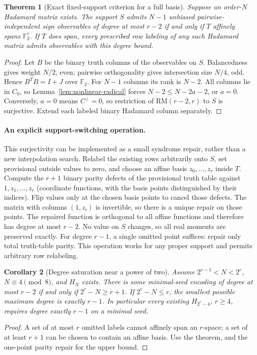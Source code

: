 \documentclass[11pt]{article}
\newtheorem{theorem}{Theorem}[section]
\newtheorem{corollary}[theorem]{Corollary}
\begin{document}
\begin{theorem}[Exact fixed-support criterion for a full basis]
\label{thm:nonlinear-fixed-support}
Suppose an order-$N$ Hadamard matrix exists. The support $S$ admits
$N-1$ unbiased pairwise-independent sign observables of degree at most
$r-2$ if and only if $T$ affinely spans $\mathbb F_2^r$.
If $T$ does span, every prescribed row labeling of any such Hadamard
matrix admits observables with this degree bound.
\end{theorem}
\begin{proof}
Let $B$ be the binary truth columns of the observables on $S$.
Balancedness gives weight $N/2$, even; pairwise orthogonality gives
intersection size $N/4$, odd. Hence $B^TB=I+J$ over $\mathbb F_2$.
For $N-1$ columns its rank is $N-2$. All columns lie in $C_0$, so
Lemma~\ref{lem:nonlinear-radical} forces
$N-2\le N-2a-2$, or $a=0$.
Conversely, $a=0$ means $C^\perp=0$, so restriction of
$\mathrm{RM}(r-2,r)$ to $S$ is surjective. Extend each labeled binary
Hadamard column separately.
\end{proof}

\paragraph{An explicit support-switching operation.}
This surjectivity can be implemented as a small syndrome repair, rather
than a new interpolation search. Relabel the existing rows arbitrarily
onto $S$, set provisional outside values to zero, and choose an affine
basis $z_0,\ldots,z_r$ inside $T$. Compute the $r+1$ binary parity defects
of the provisional truth table against $1,z_1,\ldots,z_r$ (coordinate
functions, with the basis points distinguished by their indices).
Flip values only at the chosen basis points to cancel those defects.
The matrix with columns $(1,z_i)$ is invertible, so there is a unique
repair on those points. The repaired function is orthogonal to all
affine functions and therefore has degree at most $r-2$.
No value on $S$ changes, so all real moments are preserved exactly.
For degree $r-1$, a single omitted point suffices: repair only total
truth-table parity. This operation works for any proper support and
permits arbitrary row relabeling.

\begin{corollary}[Degree saturation near a power of two]
\label{cor:nonlinear-degree-saturation}
Assume $2^{r-1}<N<2^r$, $N\equiv4\pmod8$, and $H_N$ exists.
There is some minimal-seed encoding of degree at most $r-2$ if and
only if $2^r-N\ge r+1$. If $2^r-N\le r$, the smallest possible maximum
degree is exactly $r-1$. In particular every existing
$H_{2^r-4}$, $r\ge4$, requires degree exactly $r-1$ on a minimal seed.
\end{corollary}
\begin{proof}
A set of at most $r$ omitted labels cannot affinely span an $r$-space;
a set of at least $r+1$ can be chosen to contain an affine basis.
Use the theorem, and the one-point parity repair for the upper bound.
\end{proof}
\end{document}
